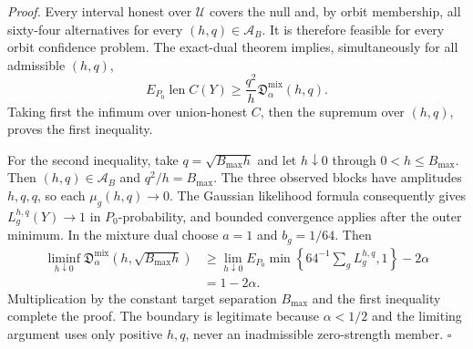 \textit{Proof.}
Every interval honest over \(\mathcal U\) covers the null and, by orbit
membership, all sixty-four alternatives for every
\((h,q)\in\mathcal A_B\).  It is therefore feasible for every orbit confidence
problem.  The exact-dual theorem implies, simultaneously for all admissible
\((h,q)\),
\[
E_{P_0}\operatorname{len}C(Y)
\geq\frac{q^2}{h}\mathfrak D_\alpha^{\mathrm{mix}}(h,q).
\]
Taking first the infimum over union-honest \(C\), then the supremum over
\((h,q)\), proves the first inequality.

For the second inequality, take \(q=\sqrt{B_{\max}h}\) and let
\(h\downarrow0\) through \(0<h\leq B_{\max}\).  Then
\((h,q)\in\mathcal A_B\) and \(q^2/h=B_{\max}\).  The three observed blocks
have amplitudes \(h,q,q\), so each \(\mu_g(h,q)\to0\).  The Gaussian
likelihood formula consequently gives \(L_g^{h,q}(Y)\to1\) in
\(P_0\)-probability, and bounded convergence applies after the outer minimum.
In the mixture dual choose \(a=1\) and \(b_g=1/64\).  Then
\[
\begin{split}
\liminf_{h\downarrow0}
\mathfrak D_\alpha^{\mathrm{mix}}(h,\sqrt{B_{\max}h})
&\geq
\lim_{h\downarrow0}E_{P_0}\min\left\{64^{-1}\sum_gL_g^{h,q},1\right\}
-2\alpha\\
&=1-2\alpha.
\end{split}
\]
Multiplication by the constant target separation \(B_{\max}\) and the first
inequality complete the proof.  The boundary is legitimate because
\(\alpha<1/2\) and the limiting argument uses only positive \(h,q\), never an
inadmissible zero-strength member. \(\square\)